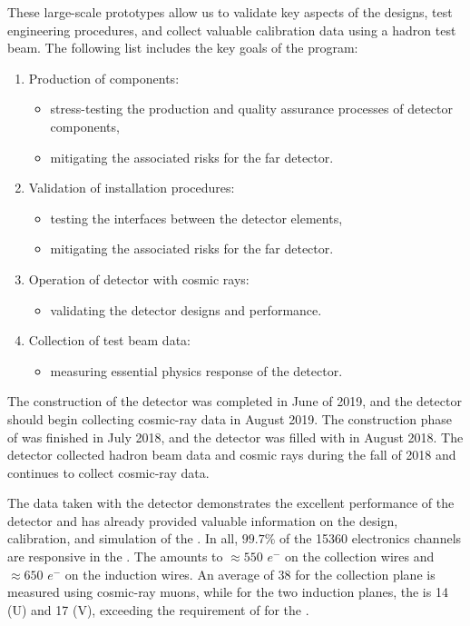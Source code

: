 These large-scale prototypes allow us to validate key aspects of the  designs, test engineering procedures, and collect valuable calibration data using a hadron test beam. The following list includes the key goals of the  program:
\begin{enumerate}
\item Production of components:
\begin{itemize}
\item stress-testing the production and quality
assurance processes of detector components,
\item mitigating the associated risks for the far detector.
\end{itemize}
\item Validation of installation procedures:
\begin{itemize}
\item testing the interfaces between the detector elements,
\item mitigating the associated risks for the far detector.
\end{itemize}
\item Operation of detector with cosmic rays:
\begin{itemize}
\item validating the detector designs and
performance.
\end{itemize}
\item Collection of test beam data:
\begin{itemize}
\item measuring essential physics response of the detector.
\end{itemize}
\end{enumerate}


 The construction of the  detector was completed in June of 2019, and the detector should begin collecting cosmic-ray data in August 2019. The construction phase of  was finished in July 2018, and the detector was filled with  in August 2018. The detector collected hadron beam data and cosmic rays during the fall of 2018 and continues to collect cosmic-ray data.

The data taken with the  detector demonstrates the excellent performance of the detector and has already provided valuable information on the design, calibration, and simulation of the  . In all, $99.7\%$ of the 15360  electronics channels are responsive in the . The  amounts to $\approx 550$ $e^{-}$ on the collection wires and $\approx 650$ $e^{-}$ on the induction wires. An average  of 38 for the collection plane is measured using cosmic-ray muons, while for the two induction planes, the  is 14 (U) and 17 (V), exceeding the requirement of %
for the  . 


